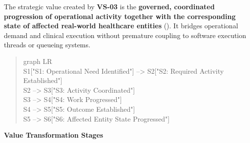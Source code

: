The strategic value created by \textbf{VS-03} is the \textbf{governed, coordinated progression of operational activity together with the corresponding state of affected real-world healthcare entities} (\texttt{}). It bridges operational demand and clinical execution without premature coupling to software execution threads or queueing systems.



\begin{quote}\small\ttfamily
graph LR\\
    S1["S1: Operational Need Identified"] --> S2["S2: Required Activity Established"]\\
    S2 --> S3["S3: Activity Coordinated"]\\
    S3 --> S4["S4: Work Progressed"]\\
    S4 --> S5["S5: Outcome Established"]\\
    S5 --> S6["S6: Affected Entity State Progressed"]\\

\end{quote}


\par\medskip\textbf{Value Transformation Stages}\par


